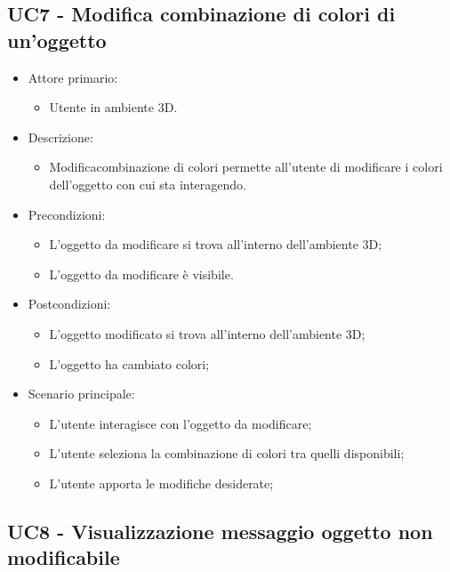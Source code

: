 \subsection{UC7 - Modifica combinazione di colori di un'oggetto}
\begin{itemize}

	\item Attore primario: 
	\begin{itemize}
		\item Utente in ambiente 3D.
	\end{itemize}
	\item Descrizione:
	\begin{itemize}
		\item Modificacombinazione di colori permette all'utente di modificare i colori dell'oggetto con cui sta interagendo.
	\end{itemize}
	
	\item Precondizioni:
	\begin{itemize}
		\item L'oggetto da modificare si trova all'interno dell'ambiente 3D;
		\item L'oggetto da modificare è visibile.
	\end{itemize}
	
	\item Postcondizioni:
	\begin{itemize}
		\item L'oggetto modificato si trova all'interno dell'ambiente 3D;
		\item L'oggetto ha cambiato colori;
	\end{itemize}
	
	\item Scenario principale:
	\begin{itemize}
		\item L'utente interagisce con l'oggetto da modificare;
		\item L'utente seleziona la combinazione di colori tra quelli disponibili;
		\item L'utente apporta le modifiche desiderate;
	\end{itemize}
	
\end{itemize}



\subsection{UC8 - Visualizzazione messaggio oggetto non modificabile}


